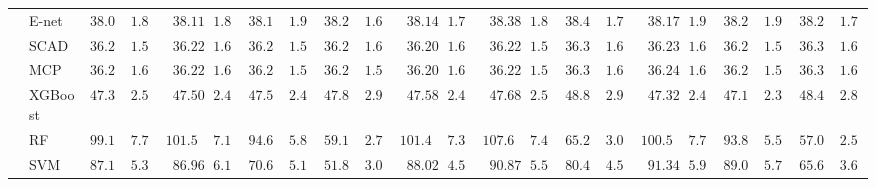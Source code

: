\begin{tabular}{p{0.2cm}p{1cm}|p{0.6cm}p{0.6cm}|p{0.6cm}p{0.6cm}p{0.6cm}p{0.6cm}p{0.6cm}p{0.6cm}|p{0.6cm}p{0.6cm}p{0.6cm}p{0.6cm}p{0.6cm}p{0.6cm}|p{0.6cm}p{0.6cm}p{0.6cm}p{0.6cm}p{0.6cm}p{0.6cm}}
 & E-net  & $38.07$ & $1.84$ & $\phantom{0}38.11$ & $1.85$ & $38.15$ & $1.95$ & $38.24$ & $1.68$ & $\phantom{0}38.14$ & $1.78$ & $\phantom{0}38.38$ & $1.82$ & $38.46$ & $1.77$ & $\phantom{0}38.17$ & $1.96$ & $38.23$ & $1.99$ & $38.21$ & $1.76$ \\
 & SCAD  & $36.21$ & $1.59$ & $\phantom{0}36.22$ & $1.60$ & $36.21$ & $1.59$ & $36.26$ & $1.61$ & $\phantom{0}36.20$ & $1.64$ & $\phantom{0}36.22$ & $1.58$ & $36.34$ & $1.65$ & $\phantom{0}36.23$ & $1.62$ & $36.21$ & $1.58$ & $36.30$ & $1.64$ \\
 & MCP  & $36.21$ & $1.60$ & $\phantom{0}36.22$ & $1.61$ & $36.22$ & $1.59$ & $36.24$ & $1.59$ & $\phantom{0}36.20$ & $1.64$ & $\phantom{0}36.22$ & $1.58$ & $36.35$ & $1.66$ & $\phantom{0}36.24$ & $1.63$ & $36.20$ & $1.57$ & $36.32$ & $1.62$ \\
 & XGBoost  & $47.39$ & $2.56$ & $\phantom{0}47.50$ & $2.42$ & $47.56$ & $2.45$ & $47.85$ & $2.96$ & $\phantom{0}47.58$ & $2.48$ & $\phantom{0}47.68$ & $2.58$ & $48.83$ & $2.97$ & $\phantom{0}47.32$ & $2.48$ & $47.18$ & $2.36$ & $48.47$ & $2.81$ \\
 & RF  & $99.19$ & $7.73$ & $101.52$ & $7.11$ & $94.67$ & $5.82$ & $59.16$ & $2.74$ & $101.49$ & $7.30$ & $107.66$ & $7.45$ & $65.28$ & $3.08$ & $100.55$ & $7.76$ & $93.89$ & $5.55$ & $57.07$ & $2.58$ \\
 & SVM  & $87.11$ & $5.38$ & $\phantom{0}86.96$ & $6.15$ & $70.61$ & $5.12$ & $51.82$ & $3.09$ & $\phantom{0}88.02$ & $4.57$ & $\phantom{0}90.87$ & $5.51$ & $80.44$ & $4.52$ & $\phantom{0}91.34$ & $5.95$ & $89.09$ & $5.76$ & $65.65$ & $3.63$ \\
\hline 
\end{tabular}

